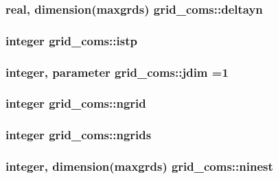 \subsubsection[{deltayn}]{\setlength{\rightskip}{0pt plus 5cm}real, dimension(maxgrds) grid\+\_\+coms\+::deltayn}\label{namespacegrid__coms_a9223404a2c92ad4c68494e9200f2d604}
\hypertarget{namespacegrid__coms_abf2dd76ce141fe111aca84a224e4df29}{}
\subsubsection[{istp}]{\setlength{\rightskip}{0pt plus 5cm}integer grid\+\_\+coms\+::istp}\label{namespacegrid__coms_abf2dd76ce141fe111aca84a224e4df29}
\hypertarget{namespacegrid__coms_ae52c617003c61ec2de61c4615fd9c707}{}
\subsubsection[{jdim}]{\setlength{\rightskip}{0pt plus 5cm}integer, parameter grid\+\_\+coms\+::jdim =1}\label{namespacegrid__coms_ae52c617003c61ec2de61c4615fd9c707}
\hypertarget{namespacegrid__coms_a40741410645b943eedf06a7c11a6197d}{}
\subsubsection[{ngrid}]{\setlength{\rightskip}{0pt plus 5cm}integer grid\+\_\+coms\+::ngrid}\label{namespacegrid__coms_a40741410645b943eedf06a7c11a6197d}
\hypertarget{namespacegrid__coms_ae4989ce85dc7d8d012ce238bcdc5946d}{}
\subsubsection[{ngrids}]{\setlength{\rightskip}{0pt plus 5cm}integer grid\+\_\+coms\+::ngrids}\label{namespacegrid__coms_ae4989ce85dc7d8d012ce238bcdc5946d}
\hypertarget{namespacegrid__coms_aed0f3b9fcb2b4db297ffcea4d0bb1450}{}
\subsubsection[{ninest}]{\setlength{\rightskip}{0pt plus 5cm}integer, dimension(maxgrds) grid\+\_\+coms\+::ninest}\label{namespacegrid__coms_aed0f3b9fcb2b4db297ffcea4d0bb1450}
\hypertarget{namespacegrid__coms_a98e39448e926de9a2fa2de1ad700e7ae}{}
